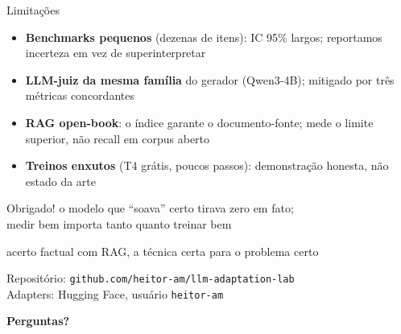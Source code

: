 \documentclass[aspectratio=169,11pt]{beamer}
\newcommand{\bignum}[1]{{\fontsize{30}{34}\selectfont\bfseries #1}}
\begin{document}
\begin{frame}{Limitações}
  \begin{itemize}
    \item \textbf{Benchmarks pequenos} (dezenas de itens):
          IC 95\% largos; reportamos incerteza em vez de
          superinterpretar
    \item \textbf{LLM-juiz da mesma família} do gerador (Qwen3-4B);
          mitigado por três métricas concordantes
    \item \textbf{RAG open-book}: o índice garante o documento-fonte;
          mede o limite superior, não recall em corpus aberto
    \item \textbf{Treinos enxutos} (T4 grátis, poucos passos):
          demonstração honesta, não estado da arte
  \end{itemize}
\end{frame}

\begin{frame}{Obrigado!}
  \centering
  o modelo que ``soava'' certo tirava zero em fato;\\
  medir bem importa tanto quanto treinar bem
  \vspace{6mm}

  {\color{tiaGreen}\bignum{0 $\Rightarrow$ 0,433}}

  \vspace{1mm}
  {\small acerto factual com RAG, a técnica certa para o problema certo}
  \vspace{7mm}

  {\footnotesize Repositório: \texttt{github.com/heitor-am/llm-adaptation-lab}\\
   Adapters: Hugging Face, usuário \texttt{heitor-am}}
  \vspace{4mm}

  {\Large\bfseries Perguntas?}
\end{frame}
\end{document}
